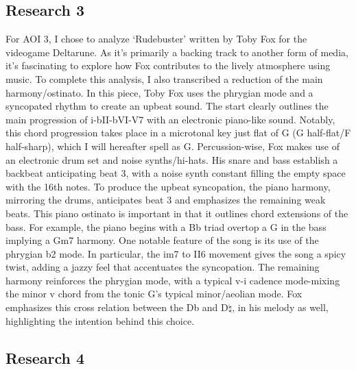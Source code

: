 \documentclass[11pt,a4paper]{article}
\begin{document}
\subsection{Research 3}

For AOI 3, I chose to analyze ‘Rudebuster’ written by Toby Fox for the videogame Deltarune. As it's primarily a backing track to another form of media, it's fascinating to explore how Fox contributes to the lively atmosphere using music. To complete this analysis, I also transcribed a reduction of the main harmony/ostinato.
In this piece, Toby Fox uses the phrygian mode and a syncopated rhythm to create an upbeat sound. The start clearly outlines the main progression of i-bII-bVI-V7 with an electronic piano-like sound. Notably, this chord progression takes place in a microtonal key just flat of G (G half-flat/F half-sharp), which I will hereafter spell as G. Percussion-wise, Fox makes use of an electronic drum set and noise synths/hi-hats. His snare and bass establish a backbeat anticipating beat 3, with a noise synth constant filling the empty space with the 16th notes. To produce the upbeat syncopation, the piano harmony, mirroring the drums, anticipates beat 3 and emphasizes the remaining weak beats. This piano ostinato is important in that it outlines chord extensions of the bass. For example, the piano begins with a Bb triad overtop a G in the bass implying a Gm7 harmony.
One notable feature of the song is its use of the phrygian b2 mode. In particular, the im7 to II6 movement gives the song a spicy twist, adding a jazzy feel that accentuates the syncopation. The remaining harmony reinforces the phrygian mode, with a typical v-i cadence mode-mixing the minor v chord from the tonic G’s typical minor/aeolian mode. Fox emphasizes this cross relation between the Db and D$\natural$, in his melody as well, highlighting the intention behind this choice.\autocite{rudebuster}

\subsection{Research 4}
\end{document}
